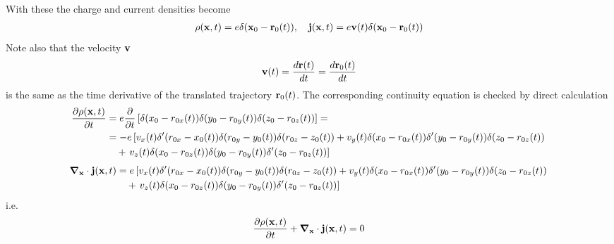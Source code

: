 With these the charge and current densities become
\begin{align}
    \rho({\bf x},t)=e\delta({\bf x}_0-{\bf r}_0(t)),\quad {\bf j}({\bf x},t)=e{\bf v}(t)\delta({\bf x}_0-{\bf r}_0(t))\label{def-J-NR-mod}
\end{align}
Note also that the velocity ${\bf v}$
\begin{align}
    {\bf v}(t) =\frac{d{\bf r}(t)}{dt} = \frac{d{\bf r}_0(t)}{dt}
\end{align}
is the same as the time derivative of the translated trajectory ${\bf r}_0(t)$.
The corresponding continuity equation is checked by direct calculation
\begin{align}
    \frac{\partial {\rho}({\bf x},t)}{\partial t} & =e\frac{\partial}{\partial t}\left[\delta({ x}_0-r_{0x}(t))\delta({ y}_0-r_{0y}(t))\delta({ z}_0-r_{0z}(t))\right]=\nonumber                                                             \\
                                                  & =-e\left[v_x(t)\delta'({ r}_{0x}-x_0(t))\delta({ r}_{0y}-y_0(t))\delta({ r}_{0z}-z_0(t))+v_y(t)\delta({ x}_0-r_{0x}(t))\delta'({ y}_0-r_{0y}(t))\delta({ z}_0-r_{0z}(t))\right.\nonumber \\
                                                  & \quad+\left.v_z(t)\delta({ x}_0-r_{0z}(t))\delta({ y}_0-r_{0y}(t))\delta'({ z}_0-r_{0z}(t))\right]
\end{align}
\begin{align}
    {\boldsymbol \nabla}_{\bf x}\cdot{\bf j}({\bf x},t) & =e\left[v_x(t)\delta'({ r}_{0x}-x_0(t))\delta({ r}_{0y}-y_0(t))\delta({ r}_{0z}-z_0(t))+v_y(t)\delta({ x}_0-r_{0x}(t))\delta'({ y}_0-r_{0y}(t))\delta({ z}_0-r_{0z}(t))\right.\nonumber \\
                                                        & \quad+\left.v_z(t)\delta({ x}_0-r_{0z}(t))\delta({ y}_0-r_{0y}(t))\delta'({ z}_0-r_{0z}(t))\right]
\end{align}
i.e.
\begin{align}
    \frac{\partial \rho({\bf x},t)}{\partial t}+{\boldsymbol \nabla}_{\bf x}\cdot{\bf j}({\bf x},t)=0
\end{align}
